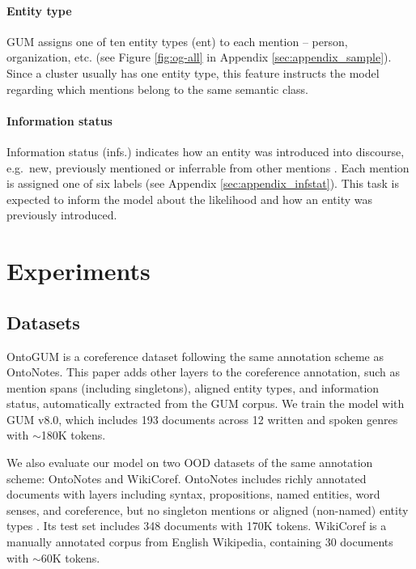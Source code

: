 \documentclass[11pt]{article}
\begin{document}
\vspace{-0.2em}
\paragraph{Entity type} GUM assigns one of ten entity types (ent) to each mention -- person, organization, etc. (see Figure \ref{fig:og-all} in Appendix \ref{sec:appendix_sample}). Since a cluster usually has one entity type, this feature instructs the model regarding which mentions belong to the same semantic class.

\vspace{-0.2em}
\paragraph{Information status} Information status (infs.) indicates how an entity was introduced into discourse, e.g.~new, previously mentioned or inferrable from other mentions \citep{Prince_Taxonomy81}. Each mention is assigned one of six labels (see Appendix \ref{sec:appendix_infstat}).
This task is expected to inform the model about the likelihood and how an entity was previously introduced.

\section{Experiments} \label{sec:experiments}

\subsection{Datasets}
OntoGUM \citep{zhu-etal-2021-ontogum} is a coreference dataset following the same annotation scheme as OntoNotes.  This paper adds other layers to the coreference annotation, such as mention spans (including singletons), aligned entity types, and information status,  automatically extracted from the GUM corpus. We train the model with GUM v8.0, which includes 193 documents across 12 written and spoken genres with $\sim$180K tokens. 


We also evaluate our model on two OOD datasets of the same annotation scheme: OntoNotes and WikiCoref. OntoNotes includes richly annotated documents with layers including syntax, propositions, named entities, word senses, and coreference, but no singleton mentions or aligned (non-named) entity types \citep{pradhan-etal-2013-towards}. Its test set includes 348 documents with 170K tokens. WikiCoref \citep{ghaddar-langlais-2016-wikicoref} is a manually annotated corpus from English Wikipedia, containing 30 documents with $\sim$60K tokens. 
\end{document}

